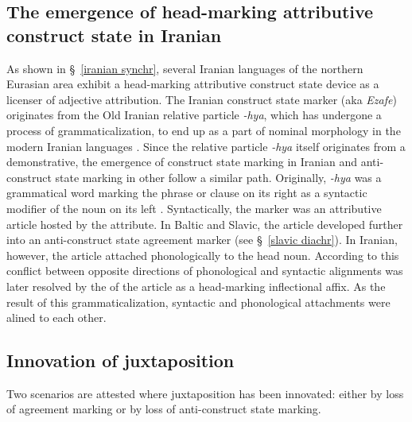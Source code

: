 {\subsection[Head-marking attributive construct state]{The emergence of head-marking attributive construct state in Iranian}\label{iranian diachr}
As shown in \S~\ref{iranian synchr}, several Iranian languages of the northern Eurasian area exhibit a head-marking attributive construct state device as a licenser of adjective attribution. The Iranian construct state marker (aka \textit{Ezafe}) originates from the Old Iranian relative particle \textit{-hya}, which has undergone a process of grammaticalization, to end up as a part of nominal morphology in the modern Iranian languages \citep{haider-etal1984,samvelian2007b}. Since the  relative particle \textit{-hya} itself originates from a demonstrative, the emergence of construct state marking in Iranian and anti\hyp{}construct state marking in other  follow a similar path. Originally, \textit{-hya} was a grammatical word marking the phrase or clause on its right as a syntactic modifier of the noun on its left \citep{haider-etal1984}. Syntactically, the marker was an attributive article hosted by the attribute. In Baltic and Slavic, the article developed further into an anti\hyp{}construct state agreement marker (see \S~\ref{slavic diachr}). In Iranian, however, the article attached phonologically to the head noun. According to \citet[3]{samvelian2007} this conflict between opposite directions of phonological and syntactic alignments was later resolved by the  of the article as a head-marking inflectional affix. As the result of this grammaticalization, syntactic and phonological attachments were alined to each other.

\subsection[Innovation of juxtaposition]{Innovation of juxtaposition}
Two scenarios are attested where juxtaposition has been innovated: either by loss of agreement marking or by loss of anti\hyp{}construct state marking.

}
